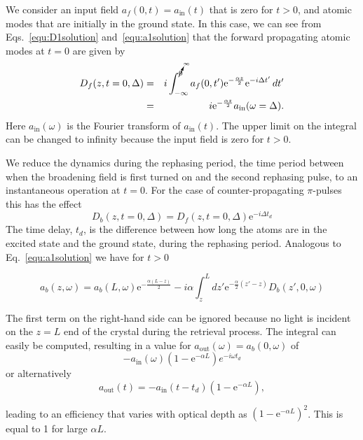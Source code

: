                                                                                                                                                                                                                                                                                                                                                                                                                                                                                                                                                                                                                                                                                                                                                                                                                                                                                                                                                                                                                                                                                                                                                                                                                                                                                                                                                                                                                                                                                                                                                                                                                                                                                                                                                                                                                                                                                                                                                                                                                                                                                                                                                                                                                                                                                                                                                                                                                                                                                                                                                                                                                                                                                                                                                                                                                                                                                                                                                                                                                                                                                                                                                                                                                                                                                                                                                                                                                                                                                                                                                                                                                                                                                                                                                                                                                                                                                                                                                                                                                                                                                                                                                                                                                                                                                                                                                                                                                                                                                                                                                                                                                                                                                                                                                                                                                                                                                                                                                                                                                                                                                                                                                                                                                                                                                                                                                                                                                                                                                                                                                                                                                                                                                                                                                                                                                                                                                                                                                                                                                                                                                                                                                                                                                                                                                                                                                                                                                                                                                                                                                                                                                                                                                                                                                                                                                                                                                                                                                                                                                                                                                                                                                                                                                                                                                                                                                                                                                                                                                                                                                                                                                                                                                                                                                                                                                                                                                                                                                                                                                                                                                                                                                                                                                                                                                                                                                                                                                                                                                                                                                                                                                                                                                                                                                                                                                                                                                                                                                                                                                                                                                                                                                                                                                                                                                                                                                                                                                                                                                                                                                                                                                                                                                                                                                                                                                                                                                                                                                                                                                                                                                                                                                                                                                                                                                                                                                                                                                                                                                                                                                                                                                                                                                                                                                                                                                                                                                                                                                                                                                                                                                                                                                                                                                                                                                                                                                                                                                                                                                                                                                                                                                                                                                                                                                                                                                                                                                                                                                                                                                                                                                                                                                                                                                                                                                                                                                                                                                                                                                                                                                                                                                                                                                                                                                                                                                                                                                                                                                                                                                                                                                                                                                                                                                                                                                                                                                                                                                                                                                                                                                                                                                                                                                                                                                                                                                                                                                                                                                                                                                                                                                                                                                                                                                                                                                                                                                                                                                                                                                                                                                                                                                                                                                                                                                                                                                                                                                                                                                                                                                                                                                                                                                                                                                                                                                                                                                                                                                                                                                                                                                                                                                                                                                                                                                                                                                                                                                                                                                                                                                                                                                                                                                                                                                                                                                                                                                                                                                                                                                                                                                                                                                                                                                                                                                                                                                                                                                                                                                                                                                                                                                                                                                                                                                                                                                                                                                                                                                                                                                                                                                                                                                                                                                                                                                                                                                                                                                                                                                                                                                                                                                                                                                                                                                                                                                                                                                                                                                                                                                                                                                                                                                                                                                                                                                                                                                                                                                                                                                                                                                                                                                                                                                                                                                                                                                                                                                                                                                                                                                                                                                                                                                                                                                                                                                                                                                                                                                                                                                                                                                                                                                                                                                                                                                                                                                                                                                                                                                                                                                                                                                                                                                                                                                                                                                                                                                                                                                                                                                                                                                                                                                                                                                                                                                                                                                                                                                                                                                                                                                                                                                                                                                                                                                                                                                                                                                                                                                                                                                                                                                                                                                                                                                                                                                                                                                                                                                                                                                                                                                                                                                                                                                                                                                                                                                                                                                                                                                                                                                                                                                                                                                                                                                                                                                                                                                                                                                                                                                                                                                                                                                                                                                                                                                                                                                                                                                                                                                                                                                                                                                                                                                                                                                                                                                                                                                                                                                                                                                                                                                                                                                                                                                                                                                                                                                                                                                                                                                                                                                                                                                                                                                                                                                                                                                                                                                                                                                                                                                                                                                                                                                                                                                                                                                                                                                                                                                                                                                                                                                                                                                                                                                                                                                                                                                                                                                                                                                                                                                                                                                                                                                                                                                                                                                                                                                                                                                                                                                                                                                                                                                                                                                                                                                                                                                                                                                                                                                                                                                                                                                                                                                                                                                                                                                                                                                                                                                                                                                                                                                                                                                                                                                                                                                                                                                                                                                                                                                                                                                                                                                                                                                                                                                                                                                                                                                                                                                                                                                                                                                                                                                                                                                                                                                                                                                                                                                                                                                                                                                                                                                                                                                                                                                                                                                                                                                                                                                                                                                                                                                                                                                                                                                                                                                                                                                                                                                                                                                                                                                                                                                                                                                                                                                                                                                                                                                                                                                                                                                                                                                                                                                                                                                                                                                                                                                                                                                                                                                                                                                                                                                                                                                                                                                                                                                                                                                                                                                                                                                                                                                                                                                                                                                                                                                                                                                                                                                                                                                                                                                                                                                                                                                                                                                                                                                                                                                                                                                                                                                                                                                                                                                                                                                                                                                                                                                                                                                                                                                                                                                                                                                                                                                                                                                                                                                                                                                                                                                                                                                                                                                                                                                                                                                                                                                                                                                                                                                                                                                                                                                                                                                                                                                                                                                                                                                                                                                                                                                                                                                                                                                                                                                                                                                                                                                                                                                                                                                                                                                                                                                                                                                                                                                                                                                                                                                                                                                                                                                                                                                                                                                                                                                                                                                                                                                                                                                                                                                                                                                                                                                                                                                                                                                                                                                                                                                                                                                                                                                                                                                                                                                                                                                                                                                                                                                                                                                                                                                                                                                                                                                                                                                                                                                                                                                                                                                                                                                                                                                                                                                                                                                                                                                                                                                                                                                                                                                                                                                                                                                                                                                                                                                                                                                                                                                                                                                                                                                                                                                                                                                                                                                                                                                                                                                                                                                                                                                                                                                                                                                                                                                                                                                                                                                                                                                                                                                                                                                                                                                                                                                                                                                                                                                                                                                                                                                                                                                                                                                                                                                                                                                                                                                                                                                                                                                                                                                                                                                                                                                                                                                                                                                                                                                                                                                                                                                                                                                                                                                                                                                                                                                                                                                                                                                                                                                                                                                                                                                                                                                                                                                                                                                                                                                                                                                                                                                                                                                                                                                                                                                                                                                                                                                                                                                                                                                                                                                                                                                                                                                                                                                                                                                                                                                                                                                                                                                                                                                                                                                                                                                                                                                                                                                                                                                                                                                                                                                                                                                                                                                                                                                                                                                                                                                                                                                                                                                                                                                                                                                                                                                                                                                                                                                                                                                                                                                                                                                                                                                                                                                                                                                                                                                                                                                                                                                                                                                                                                                                                                                                                                                                                                                                                                                                                                                                                                                                                                                                                                                                                                                                                                                                                                                                                                                                                                                                                                                                                                                                                                                                                                                                                                                                                                                                                                                                                                                                                                                                                                                                                                                                                                                                                                                                                                                                                                                                                                                                                                                                                                                                                                                                                                                                                                                                                                                                                                                                                                                                                                                                                                                                                                                                                                                                                                                                                                                                                                                                                                                                                                                                                                                                                                                                                                                                                                                                                                                                                                                                                                                                                                                                                                                                                                                                                                                                                                                                                                                                                                                                                                                                                                                                                                                                                                                                                                                                                                                                                                                                                                                                                                                                                                                                                                                                                                                                                                                                                                                                                                                                                                                                                                                                                                                                                                                                                                                                                                                                                                                                                                                                                                                                                                                                                                                                                                                                                                                                                                                                                                                                                                                                                                                                                                                                                                                                                                                                                                                                                                                                                                                                                                                                                                                                                                                                                    \documentclass[superscriptaddress,pra,twocolumn,showpacs,amsmath,amssymb,aps,a4paper]{revtex4}
\begin{document}
We consider an input field $a_f(0,t) = a_\text{in}(t)$ that is zero for $t>0$, and atomic modes that are initially in the ground state.
In this case, we can see from Eqs.~\ref{equ:D1solution} and~\ref{equ:a1solution} that the forward propagating atomic modes at $t=0$ are given by
\begin{eqnarray}
  \label{eq:jevon1}
  D_f(z,t=0,\Delta) &=& i \int_{-\infty}^{\cancelto{\infty}{0}}a_f(0,t')\text{e}^{-\frac{\alpha z}{2}}\text{e}^{-i\Delta t'}\,dt'\nonumber\\
  &=&i\text{e}^{-\frac{\alpha z}{2}} a_\text{in}(\omega=\Delta).
\end{eqnarray}
Here $a_\text{in}(\omega)$ is the Fourier transform of $a_\text{in}(t)$. The upper limit on the integral can be changed to infinity because the input field is zero for $t>0$.

We reduce the dynamics during the rephasing period, the time period between when the broadening field is first turned on and the second rephasing pulse, to an instantaneous operation at $t=0$. For the case of counter-propagating $\pi$-pulses this has the effect
\begin{equation}
  D_b(z,t=0,\Delta) = D_f(z,t=0,\Delta)\text{e}^{-i\Delta t_d}
\end{equation}
The time delay, $t_d$, is the difference between how long the atoms are in the excited state and the ground state, during the rephasing period. Analogous to Eq.~\ref{equ:a1solution} we have for $t>0$

\begin{equation}{a}_b(z,\omega) = {a}_b(L,\omega)\text{e}^{-\frac{\alpha (L-z)}{2}} -
i\alpha \int^L_z dz' \text{e}^{-\frac{\alpha}{2}(z'-z)}D_b(z',0,\omega) 
\end{equation}

The first term on the right-hand side can be ignored because no light is incident on the $z=L$ end of the crystal during the retrieval process. The integral can easily be computed, resulting in a value for $a_\text{out}(\omega) = a_b(0,\omega)$ of 
\begin{equation}
 -a_\text{in}(\omega)(1-\text{e}^{-\alpha L})e^{-i\omega t_d}
\end{equation}
or alternatively
\begin{equation}
a_\text{out}(t) =  -a_\text{in}(t-t_d)(1-\text{e}^{-\alpha L}),
\end{equation}

leading to an efficiency that varies with optical depth as $(1-\text{e}^{-\alpha L})^2$. This is equal to 1 for large $\alpha L$.
\end{document}
